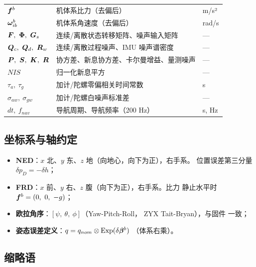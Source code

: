 \begin{table}[H]
\begin{tabularx}{\textwidth}{@{}C{2.6cm}L{5.4cm}X@{}}
$\boldsymbol{f}^b$ & 机体系比力（去偏后） & m/s² \\
$\boldsymbol{\omega}_{ib}^b$ & 机体系角速度（去偏后） & rad/s \\
$\boldsymbol{F},\ \bm{\Phi},\ \boldsymbol{G}_s$ & 连续/离散状态转移矩阵、噪声输入矩阵 & — \\
$\boldsymbol{Q}_c,\ \boldsymbol{Q}_d,\ \boldsymbol{R}_w$ & 连续/离散过程噪声、IMU 噪声谱密度 & — \\
$\boldsymbol{P},\ \boldsymbol{S},\ \boldsymbol{K},\ \boldsymbol{R}$ & 协方差、新息协方差、卡尔曼增益、量测噪声 & — \\
$NIS$ & 归一化新息平方 & — \\
$\tau_a,\ \tau_g$ & 加计/陀螺零偏相关时间常数 & s \\
$\sigma_{aw},\ \sigma_{gw}$ & 加计/陀螺白噪声标准差 & — \\
$dt,\ f_{nav}$ & 导航周期、导航频率（200 Hz） & s, Hz \\
\bottomrule
\end{tabularx}
\end{table}

\subsection{坐标系与轴约定}

\begin{itemize}
  \item \textbf{NED}：$x$ 北、$y$ 东、$z$ 地（向地心，向下为正），右手系。
    位置误差第三分量 $\delta p_D = -\delta h$；
  \item \textbf{FRD}：$x$ 前、$y$ 右、$z$ 腹（向下为正），右手系。比力
    静止水平时 $\boldsymbol{f}^b = (0,\ 0,\ -g)$；
  \item \textbf{欧拉角序}：$[\psi,\ \theta,\ \phi]$（Yaw-Pitch-Roll，
    ZYX Tait-Bryan），与固件  一致；
  \item \textbf{姿态误差定义}：$q = q_{nom}\otimes\operatorname{Exp}(\delta\boldsymbol{\beta}^b)$
    （体系右乘）。
\end{itemize}

\subsection{缩略语}


